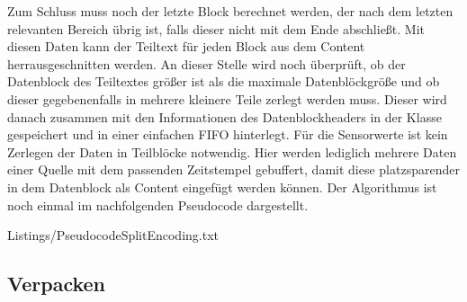 Zum Schluss muss noch der letzte Block berechnet werden, der nach dem letzten
relevanten Bereich {\"u}brig ist, falls dieser nicht mit dem Ende abschließt. Mit
diesen Daten kann der Teiltext f{\"u}r jeden Block aus dem Content
herrausgeschnitten werden. An dieser Stelle wird noch {\"u}berpr{\"u}ft, ob der
Datenblock des Teiltextes gr{\"o}{\ss}er ist als die maximale
Datenbl{\"o}ckgr{\"o}{\ss}e und ob dieser gegebenenfalls in mehrere kleinere
Teile zerlegt werden muss. Dieser wird danach zusammen mit den Informationen des Datenblockheaders in der Klasse 
gespeichert und in einer einfachen \gls{FIFO} hinterlegt. F{\"u}r die Sensorwerte
ist kein Zerlegen der Daten in Teilbl{\"o}cke notwendig.
Hier werden lediglich mehrere Daten einer Quelle mit dem passenden
Zeitstempel gebuffert, damit diese platzsparender in dem Datenblock als
Content eingef{\"u}gt werden k{\"o}nnen. \newline
Der Algorithmus ist noch einmal im nachfolgenden Pseudocode dargestellt.

\lstset{language=pseudo}
\lstset{commentstyle=\textit}
 {Listings/PseudocodeSplitEncoding.txt}

\subsection{Verpacken}

